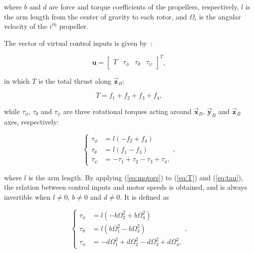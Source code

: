 where $b$ and $d$ are force and torque coefficients of the propellers,
respectively, $l$ is the arm length from the center of gravity to each rotor,
and $\Omega_i$ is the angular velocity of the $i^{th}$ propeller.

The vector of virtual control inputs is given by~\cite{Mahony2012RAM}:

\begin{equation}
  \mathbf{u} = \begin{bmatrix}T & \tau_{\phi} & \tau_{\theta} & \tau_{\psi} \end{bmatrix}^T,
  \label{eq:inputs}
\end{equation}

in which $T$ is the total thrust along $\vec{\mathbf{z}}_B$:

\begin{equation}
  T = f_1 + f_2 + f_3 + f_4,
  \label{eq:T}
\end{equation}

while $\tau_{\phi}$, $\tau_{\theta}$ and $\tau_{\psi}$ are three rotational torques acting
around $\vec{\mathbf{x}}_B$, $\vec{\mathbf{y}}_B$ and $\vec{\mathbf{z}}_B$
axes, respectively:

\begin{equation}
  \begin{cases}
    \tau_{\phi} &= l (-f_2 + f_4) \\
    \tau_{\theta} &= l (f_1 - f_3) \\
    \tau_{\psi} &= -\tau_1 + \tau_2 - \tau_3 + \tau_4,
  \end{cases},
  \label{eq:tau}
\end{equation}

\noindent where $l$ is the arm length. By applying (\ref{eq:motors}) to
(\ref{eq:T}) and (\ref{eq:tau}), the relation between control inputs and motor
speeds is obtained, and is always invertible when $l \neq 0$, $b \neq 0$ and
$d \neq 0$. It is defined as

\begin{equation}
  \begin{cases}
    \tau_{\phi} &= l (-b\Omega_2^2 + b\Omega_4^2) \\
    \tau_{\theta} &= l (b\Omega_1^2 - b\Omega_3^2) \\
    \tau_{\psi} &= -d\Omega_1^2 + d\Omega_2^2 - d\Omega_3^2 + d\Omega_4^2,
  \end{cases},
  \label{eq:tau}
\end{equation}


